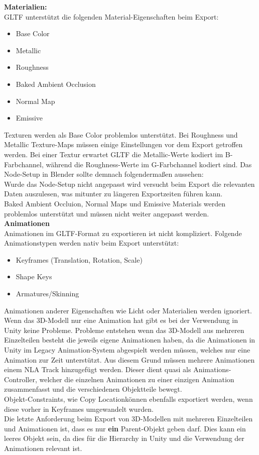 \documentclass[12pt,a4paper]{article}
\begin{document}
\textbf{Materialien:}\\
GLTF unterstützt die folgenden Material-Eigenschaften beim Export:
\begin{itemize}
\item Base Color
\item Metallic
\item Roughness
\item Baked Ambient Occlusion
\item Normal Map
\item Emissive
\end{itemize}
Texturen werden als Base Color problemlos unterstützt. Bei Roughness und Metallic Texture-Maps müssen einige Einstellungen vor dem Export getroffen werden. Bei einer Textur erwartet GLTF die Metallic-Werte kodiert im B-Farbchannel, während die Roughness-Werte im G-Farbchannel kodiert sind. Das Node-Setup in Blender sollte demnach folgendermaßen aussehen:\\
Wurde das Node-Setup nicht angepasst wird versucht beim Export die relevanten Daten auszulesen, was mitunter zu längeren Exportzeiten führen kann.\\
Baked Ambient Occluion, Normal Maps und Emissive Materials werden problemlos unterstützt und müssen nicht weiter angepasst werden.\\

\textbf{Animationen}\\
Animationen im GLTF-Format zu exportieren ist nicht kompliziert. Folgende Animationstypen werden nativ beim Export unterstützt:
\begin{itemize}
\item Keyframes (Translation, Rotation, Scale)
\item Shape Keys
\item Armatures/Skinning
\end{itemize}
Animationen anderer Eigenschaften wie Licht oder Materialien werden ignoriert.\\
Wenn das 3D-Modell nur eine Animation hat gibt es bei der Verwendung in Unity keine Probleme. Probleme entstehen wenn das 3D-Modell aus mehreren Einzelteilen besteht die jeweils eigene Animationen haben, da die Animationen in Unity im Legacy Animation-System abgespielt werden müssen, welches nur eine Animation zur Zeit unterstützt. Aus diesem Grund müssen mehrere Animationen einem NLA Track hinzugefügt werden. Dieser dient quasi als Animations-Controller, welcher die einzelnen Animationen zu einer einzigen Animation zusammenfasst und die verschiedenen Objektteile bewegt.\\
Objekt-Constraints, wie \glqq Copy Location\grqq können ebenfalls exportiert werden, wenn diese vorher in Keyframes umgewandelt wurden.\\
Die letzte Anforderung beim Export von 3D-Modellen mit mehreren Einzelteilen und Animationen ist, dass es nur \textbf{ein} Parent-Objekt geben darf. Dies kann ein leeres Objekt sein, da dies für die Hierarchy in Unity und die Verwendung der Animationen relevant ist.\\
\end{document}
